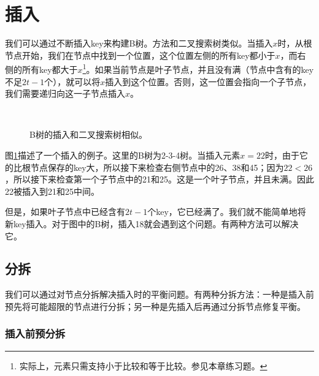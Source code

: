 \documentclass[UTF8]{article}
\begin{document}
\section{插入}
\label{btree-insertion}

我们可以通过不断插入key来构建B树。方法和二叉搜索树类似。当插入$x$时，从根节点开始，我们在节点中找到一个位置，这个位置左侧的所有key都小于$x$，而右侧的所有key都大于$x$\footnote{实际上，元素只需支持小于比较和等于比较。参见本章练习题。}。如果当前节点是叶子节点，并且没有满（节点中含有的key不足$2t-1$个），就可以将$x$插入到这个位置。否则，这一位置会指向一个子节点，我们需要递归向这一子节点插入$x$。

\begin{figure}[htbp]
  \centering
   \\
  \caption{B树的插入和二叉搜索树相似。} \label{fig:btree-insert-simple}
\end{figure}

图\ref{fig:btree-insert-simple}描述了一个插入的例子。这里的B树为2-3-4树。当插入元素$x=22$时，由于它的比根节点保存的key大，所以接下来检查右侧节点中的26、38和45；因为$22 < 26$，所以接下来检查第一个子节点中的21和25。这是一个叶子节点，并且未满。因此22被插入到21和25中间。

但是，如果叶子节点中已经含有$2t-1$个key，它已经满了。我们就不能简单地将新key插入。对于图中的B树，插入18就会遇到这个问题。有两种方法可以解决它。

\subsection{分拆}
\label{split}

我们可以通过对节点分拆解决插入时的平衡问题。有两种分拆方法：一种是插入前预先将可能超限的节点进行分拆；另一种是先插入后再通过分拆节点修复平衡。

\subsubsection{插入前预分拆}
\end{document}
